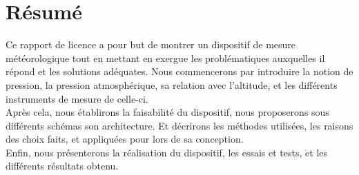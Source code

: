 \chapter*{Résumé}
 


	Ce rapport de licence a pour but de montrer un dispositif de mesure météorologique tout en mettant en exergue les problématiques auxquelles il répond et les solutions adéquates. Nous commencerons par introduire la notion de pression, la pression atmosphérique, sa relation avec l'altitude, et les différents instruments de mesure de celle-ci.\\

Après cela, nous établirons la faisabilité du dispositif, nous proposerons sous différents schémas son architecture. Et décrirons les méthodes utilisées, les raisons des choix faits, et appliquées pour lors de sa conception.\\

Enfin, nous présenterons la réalisation du dispositif, les essais et tests, et les différents résultats obtenu.\\       
 


